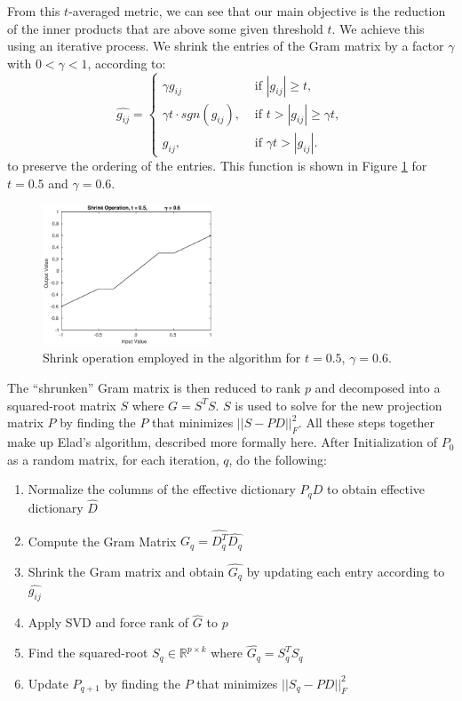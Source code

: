 \documentclass[journal]{IEEEtran}
\begin{document}
From this $t$-averaged metric, we can see that our main objective is the reduction of the inner products that are above some given threshold $t$.  We achieve this using an iterative process.  We shrink the entries of the Gram matrix by a factor $\gamma$ with $ 0 < \gamma < 1$, according to: $$ \hat{g_{ij}} = \begin{cases} \gamma g_{ij} & \mbox{ if } |g_{ij}| \geq t, \\ \gamma t \cdot sgn(g_{ij}), & \mbox{ if } t > |g_{ij}| \geq \gamma t, \\ g_{ij}, & \mbox{ if } \gamma t > |g_{ij}|. \end{cases} $$ to preserve the ordering of the entries.  This function is shown in Figure \ref{fig:shrink} for $t = 0.5$ and $\gamma = 0.6$.

\begin{figure}[]
  \centering
  \includegraphics[width=0.45\textwidth]{shrink.eps}
  \caption{Shrink operation employed in the algorithm for $t = 0.5$, $\gamma = 0.6$.}
  \label{fig:shrink}
\end{figure}

The ``shrunken'' Gram matrix is then reduced to rank $p$ and decomposed into a squared-root matrix $S$ where $G = S^TS$.  $S$ is used to solve for the new projection matrix $P$ by finding the $P$ that minimizes $ || S - PD ||_F^2$.  All these steps together make up Elad's algorithm, described more formally here.  After Initialization of $P_0$ as a random matrix, for each iteration, $q$, do the following:
\begin{enumerate}
\item Normalize the columns of the effective dictionary $P_q D$ to obtain effective dictionary $\hat{D}$
\item Compute the Gram Matrix $G_q = \hat{D_q^T} \hat{D_q}$
\item Shrink the Gram matrix and obtain $\hat{G_q}$ by updating each entry according to $\hat{g_{ij}}$
\item Apply SVD and force rank of $\hat{G}$ to $p$
\item Find the squared-root $S_q \in \mathbb{R}^{p \times k}$ where $\hat{G_q} = S_q^TS_q$
\item Update $P_{q+1}$ by finding the $P$ that minimizes $|| S_q - PD ||_F^2$
\end{enumerate}
\end{document}
